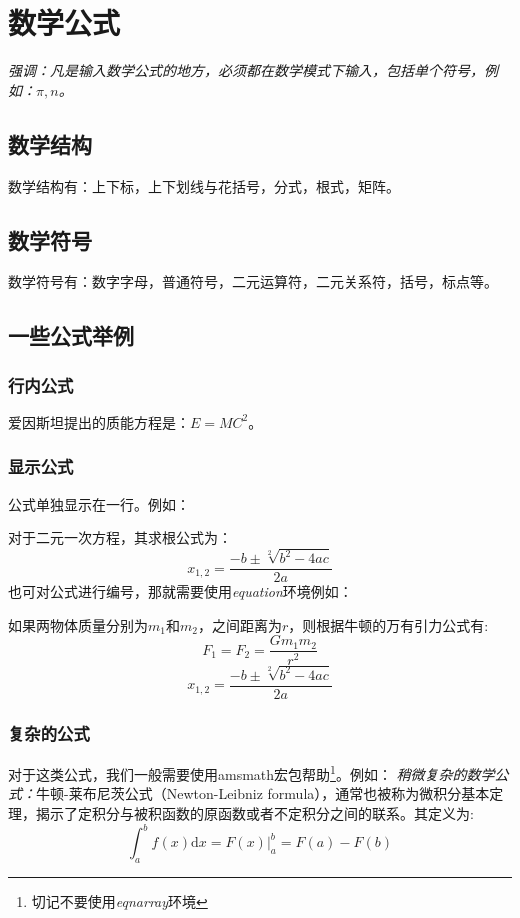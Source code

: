 \documentclass{ctexart} %
\begin{document}
    \section{数学公式}
    \emph{强调：凡是输入数学公式的地方，必须都在数学模式下输入，包括单个符号，例如：$\pi, n$。}
        \subsection{数学结构}
            数学结构有：上下标，上下划线与花括号，分式，根式，矩阵。
        \subsection{数学符号}
            数学符号有：数字字母，普通符号，二元运算符，二元关系符，括号，标点等。
        \subsection{一些公式举例}
            \subsubsection{行内公式}
            爱因斯坦提出的质能方程是：$E=MC^2$。
            \subsubsection{显示公式}
            公式单独显示在一行。例如：

            对于二元一次方程，其求根公式为：
            \[ 
                x_{1,2} = \frac{-b \pm \sqrt[2]{b^2-4ac}}{2a}    
            \] %
            也可对公式进行编号，那就需要使用\emph{equation}环境例如：

            如果两物体质量分别为$m_1$和$m_2$，之间距离为$r$，则根据牛顿的万有引力公式有:
            \begin{equation}
                F_1 = F_2 = \frac{Gm_1m_2}{r^2}
            \end{equation}
            \begin{equation}
                x_{1,2} = \frac{-b \pm \sqrt[2]{b^2-4ac}}{2a} 
            \end{equation}

            \subsubsection{复杂的公式}
            对于这类公式，我们一般需要使用amsmath宏包帮助\footnote{切记不要使用\emph{eqnarray}环境}。例如：
            \emph{稍微复杂的数学公式：}牛顿-莱布尼茨公式（Newton-Leibniz formula），通常也被称为微积分基本定理，揭示了定积分与被积函数的原函数或者不定积分之间的联系。其定义为:
            \begin{equation}
                \int_a^b f(x) \mathrm{d}x = F(x)|_a^b = F(a) - F(b)
            \end{equation}
\end{document}
